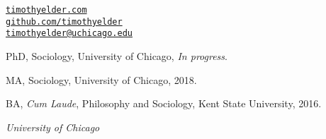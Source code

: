 \documentclass[11pt,article,oneside]{memoir}
\makeatletter
\def\myemail{timothyelder@uchicago.edu}
\def\myweb{timothyelder.com}
\makeatother
\begin{document}
\begin{minipage}[t]{2.95in}

\end{minipage}
\hfill
\hfill
\begin{minipage}[t]{1.5in}
  \flushright \footnotesize  \addressblock
  {\scriptsize  \texttt{\href{http://timothyelder.com/}{\myweb}}}  \\
  {\scriptsize  \texttt{\href{https://github.com/timothyelder}{github.com/timothyelder} } \\
  {\scriptsize  \texttt{\href{mailto:\myemail}{\myemail}} }}
\end{minipage}

\medskip

\reversemarginpar

\bigskip



\ind PhD, Sociology, University of Chicago, \emph{In progress}.


\ind MA, Sociology, University of Chicago, 2018.

\ind BA, \emph{Cum Laude}, Philosophy and Sociology, Kent State University, 2016.

\bigskip

\medskip
\noindent\emph{University of Chicago \vspace{0.01in}}
\end{document}
